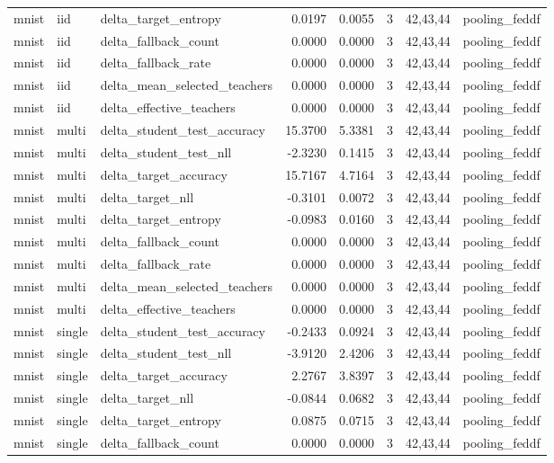 \begin{tabular}{lllrrrll}
mnist & iid & delta\_target\_entropy & 0.0197 & 0.0055 & 3 & 42,43,44 & pooling\_feddf \\
mnist & iid & delta\_fallback\_count & 0.0000 & 0.0000 & 3 & 42,43,44 & pooling\_feddf \\
mnist & iid & delta\_fallback\_rate & 0.0000 & 0.0000 & 3 & 42,43,44 & pooling\_feddf \\
mnist & iid & delta\_mean\_selected\_teachers & 0.0000 & 0.0000 & 3 & 42,43,44 & pooling\_feddf \\
mnist & iid & delta\_effective\_teachers & 0.0000 & 0.0000 & 3 & 42,43,44 & pooling\_feddf \\
mnist & multi & delta\_student\_test\_accuracy & 15.3700 & 5.3381 & 3 & 42,43,44 & pooling\_feddf \\
mnist & multi & delta\_student\_test\_nll & -2.3230 & 0.1415 & 3 & 42,43,44 & pooling\_feddf \\
mnist & multi & delta\_target\_accuracy & 15.7167 & 4.7164 & 3 & 42,43,44 & pooling\_feddf \\
mnist & multi & delta\_target\_nll & -0.3101 & 0.0072 & 3 & 42,43,44 & pooling\_feddf \\
mnist & multi & delta\_target\_entropy & -0.0983 & 0.0160 & 3 & 42,43,44 & pooling\_feddf \\
mnist & multi & delta\_fallback\_count & 0.0000 & 0.0000 & 3 & 42,43,44 & pooling\_feddf \\
mnist & multi & delta\_fallback\_rate & 0.0000 & 0.0000 & 3 & 42,43,44 & pooling\_feddf \\
mnist & multi & delta\_mean\_selected\_teachers & 0.0000 & 0.0000 & 3 & 42,43,44 & pooling\_feddf \\
mnist & multi & delta\_effective\_teachers & 0.0000 & 0.0000 & 3 & 42,43,44 & pooling\_feddf \\
mnist & single & delta\_student\_test\_accuracy & -0.2433 & 0.0924 & 3 & 42,43,44 & pooling\_feddf \\
mnist & single & delta\_student\_test\_nll & -3.9120 & 2.4206 & 3 & 42,43,44 & pooling\_feddf \\
mnist & single & delta\_target\_accuracy & 2.2767 & 3.8397 & 3 & 42,43,44 & pooling\_feddf \\
mnist & single & delta\_target\_nll & -0.0844 & 0.0682 & 3 & 42,43,44 & pooling\_feddf \\
mnist & single & delta\_target\_entropy & 0.0875 & 0.0715 & 3 & 42,43,44 & pooling\_feddf \\
mnist & single & delta\_fallback\_count & 0.0000 & 0.0000 & 3 & 42,43,44 & pooling\_feddf \\

\end{tabular}
